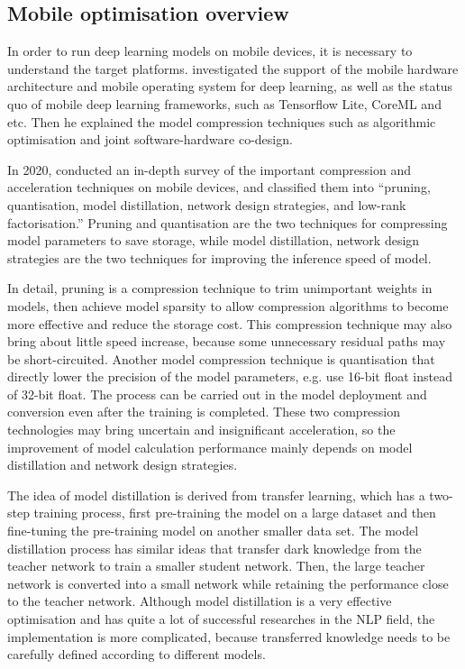 \subsection{Mobile optimisation overview}
In order to run deep learning models on mobile devices, it is necessary to understand the target platforms.
\citet{deng2019deep} investigated the support of the mobile hardware architecture and mobile operating system for deep learning, as well as the status quo of mobile deep learning frameworks, such as Tensorflow Lite, CoreML and etc.
Then he explained the model compression techniques such as algorithmic optimisation and joint software-hardware co-design.

In 2020, \citet{chen2020deep} conducted an in-depth survey of the important compression and acceleration techniques on mobile devices, and classified them into ``pruning, quantisation, model distillation, network design strategies, and low-rank factorisation.''
Pruning and quantisation are the two techniques for compressing model parameters to save storage, while model distillation, network design strategies are the two techniques for improving the inference speed of model.

In detail, pruning is a compression technique to trim unimportant weights in models, then achieve model sparsity to allow compression algorithms to become more effective and reduce the storage cost.
This compression technique may also bring about little speed increase, because some unnecessary residual paths may be short-circuited.
Another model compression technique is quantisation that directly lower the precision of the model parameters, e.g. use 16-bit float instead of 32-bit float.
The process can be carried out in the model deployment and conversion even after the training is completed.
These two compression technologies may bring uncertain and insignificant acceleration, so the improvement of model calculation performance mainly depends on model distillation and network design strategies.

The idea of model distillation is derived from transfer learning, which has a two-step training process, first pre-training the model on a large dataset and then fine-tuning the pre-training model on another smaller data set.
The model distillation process has similar ideas that transfer dark knowledge from the teacher network to train a smaller student network.
Then, the large teacher network is converted into a small network while retaining the performance close to the teacher network.
Although model distillation is a very effective optimisation and has quite a lot of successful researches in the NLP field, the implementation is more complicated, because transferred knowledge needs to be carefully defined according to different models.